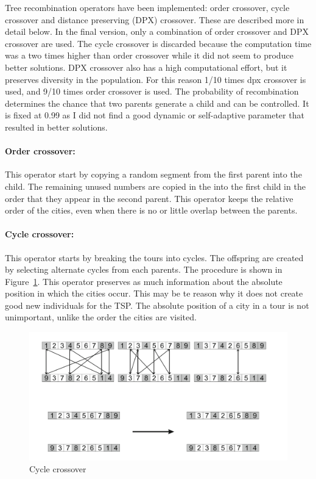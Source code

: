 \documentclass[a4paper,10pt]{article}
\begin{document}
Tree recombination operators have been implemented: order crossover, cycle crossover and distance preserving (DPX) crossover. These are described more in detail below. In the final version, only a combination of order crossover and DPX crossover are used. The cycle crossover is discarded because the computation time was a two times higher than order crossover while it did not seem to produce better solutions. DPX crossover also has a high computational effort, but it preserves diversity in the population. For this reason 1/10 times dpx crossover is used, and 9/10 times order crossover is used. The probability of recombination determines the chance that two parents generate a child and can be controlled. It is fixed at 0.99 as I did not find a good dynamic or self-adaptive parameter that resulted in better solutions. 
\paragraph{Order crossover:} This operator start by copying a random segment from the first parent into the child. The remaining unused numbers are copied in the into the first child in the order that they appear in the second parent. This operator keeps the relative order of the cities, even when there is no or little overlap between the parents.                                              
\paragraph{Cycle crossover:} This operator starts by breaking the tours into cycles. The offspring are created by selecting alternate cycles from each parents. The procedure is shown in Figure~\ref{fig:cyclecrossover}. This operator preserves as much information about the absolute position in which the cities occur. This may be te reason why it does not create good new individuals for the TSP. The absolute position of a city in a tour is not unimportant, unlike the order the cities are visited. 
\begin{figure}[H]
  \centering
  \includegraphics[width=.6\textwidth]{img/cyclecrossover.png}
  \caption{Cycle crossover \cite{EibenA.E2015ItEC}}
  \label{fig:cyclecrossover}
\end{figure}
\end{document}

